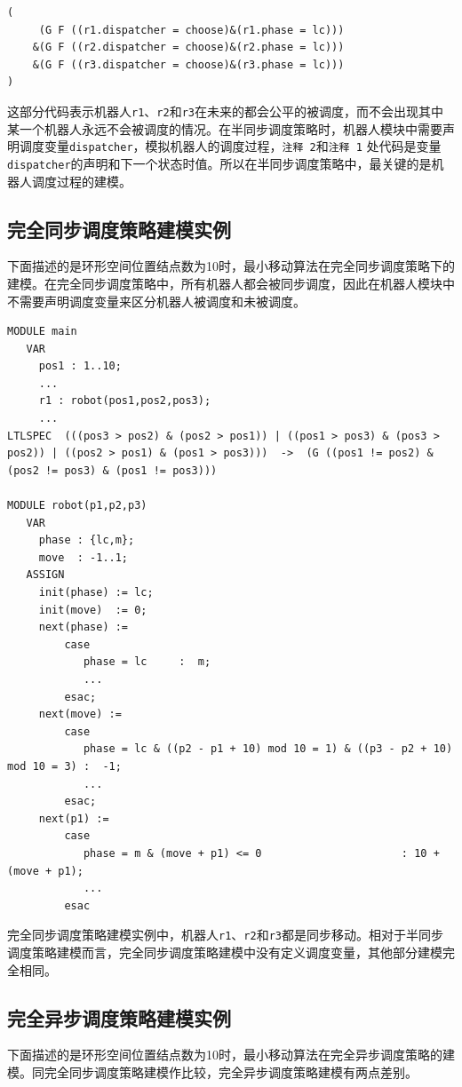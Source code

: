 \begin{lstlisting}
(
     (G F ((r1.dispatcher = choose)&(r1.phase = lc)))
    &(G F ((r2.dispatcher = choose)&(r2.phase = lc)))
    &(G F ((r3.dispatcher = choose)&(r3.phase = lc)))
)
\end{lstlisting}

这部分代码表示机器人\verb|r1|、\verb|r2|和\verb|r3|在未来的都会公平的被调度，而不会出现其中某一个机器人永远不会被调度的情况。在半同步调度策略时，机器人模块中需要声明调度变量\verb|dispatcher|，模拟机器人的调度过程，\verb|注释 2|和\verb|注释 1| 处代码是变量\verb|dispatcher|的声明和下一个状态时值。所以在半同步调度策略中，最关键的是机器人调度过程的建模。

\subsection{完全同步调度策略建模实例}
下面描述的是环形空间位置结点数为10时，最小移动算法在完全同步调度策略下的建模。在完全同步调度策略中，所有机器人都会被同步调度，因此在机器人模块中不需要声明调度变量来区分机器人被调度和未被调度。

\begin{lstlisting}
MODULE main
   VAR
     pos1 : 1..10;
     ...
     r1 : robot(pos1,pos2,pos3);
     ...
LTLSPEC  (((pos3 > pos2) & (pos2 > pos1)) | ((pos1 > pos3) & (pos3 > pos2)) | ((pos2 > pos1) & (pos1 > pos3)))  ->  (G ((pos1 != pos2) & (pos2 != pos3) & (pos1 != pos3)))

MODULE robot(p1,p2,p3)
   VAR
     phase : {lc,m};
     move  : -1..1;
   ASSIGN
     init(phase) := lc;
     init(move)  := 0;
     next(phase) :=
         case
            phase = lc     :  m;
            ...
         esac;
     next(move) :=
         case
            phase = lc & ((p2 - p1 + 10) mod 10 = 1) & ((p3 - p2 + 10) mod 10 = 3) :  -1;
            ...
         esac;
     next(p1) :=
         case
            phase = m & (move + p1) <= 0                      : 10 + (move + p1);
            ...
         esac
\end{lstlisting}

完全同步调度策略建模实例中，机器人\verb|r1|、\verb|r2|和\verb|r3|都是同步移动。相对于半同步调度策略建模而言，完全同步调度策略建模中没有定义调度变量，其他部分建模完全相同。


\subsection{完全异步调度策略建模实例}
下面描述的是环形空间位置结点数为10时，最小移动算法在完全异步调度策略的建模。同完全同步调度策略建模作比较，完全异步调度策略建模有两点差别。


